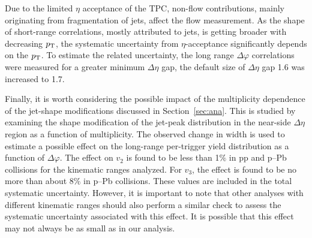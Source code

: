 Due to the limited $\eta$ acceptance of the TPC, non-flow contributions, mainly originating from fragmentation of jets, affect the flow measurement. As the shape of short-range correlations, mostly attributed to jets, is getting broader with decreasing $p_\mathrm{T}$, the systematic uncertainty from $\eta$-acceptance significantly depends on the $p_{\rm{T}}$. To estimate the related uncertainty, the long range $\Delta\varphi$ correlations were measured for a greater minimum $\Delta\eta$ gap, the default size of $\Delta\eta$ gap 1.6 was increased to 1.7.

Finally, it is worth considering the possible impact of the multiplicity dependence of the jet-shape modifications discussed in Section~\ref{sec:ana}. This is studied by examining the shape modification of the jet-peak distribution in the near-side $\Delta\eta$ region as a function of  multiplicity. The observed change in width is used to estimate a possible effect on the long-range per-trigger yield distribution as a function of $\Delta\varphi$. The effect on $v_2$ is found to be less than 1$\%$ in pp and p--Pb collisions for the kinematic ranges analyzed. For $v_3$, the effect is found to be no more than about 8$\%$ in p--Pb collisions. These values are included in the total systematic uncertainty. However, it is important to note that other analyses with different kinematic ranges should also perform a similar check to assess the systematic uncertainty associated with this effect. It is possible that this effect may not always be as small as in our analysis.





